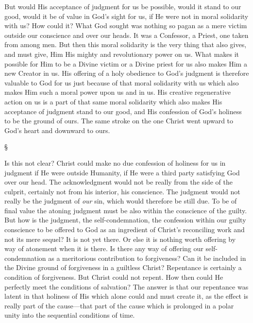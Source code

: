 \documentclass[12pt,letterpaper,oneside]{book}
\begin{document}
But would His acceptance of judgment for us 
be possible, would it stand to our good, would 
it be of value in God's sight for us, if He 
were not in moral solidarity with us? How 
could it? What God sought was nothing so 
pagan as a mere victim outside our conscience 
and over our heads. It was a Confessor, a 
Priest, one taken from among men. But then 
this moral solidarity is the very thing that 
also gives, and must give, Him His mighty and 
revolutionary power on us. What makes it 
possible for Him to be a Divine victim or a 
Divine priest for us also makes Him a new 
Creator in us. His offering of a holy obedience 
to God's judgment is therefore valuable to God 
for us just because of that moral solidarity 
with us which also makes Him such a moral 
power upon us and in us. His creative regenerative 
action on us is a part of that same 
moral solidarity which also makes His acceptance
of judgment stand to our good, and His 
confession of God's holiness to be the ground 
of ours. The same stroke on the one Christ 
went upward to God's heart and downward 
to ours. 

\begin{center}
\S
\end{center}

Is this not clear? Christ could make no due 
confession of holiness for us in judgment if 
He were outside Humanity, if He were a third 
party satisfying God over our head. The acknowledgment 
would not be really from the 
side of the culprit, certainly not from his interior, 
his conscience. The judgment would not 
really be the judgment of \textit{our} sin, which would 
therefore be still due. To be of final value 
the atoning judgment must be also within the 
conscience of the guilty. But how is the judgment, 
the self-condemnation, the confession within 
our guilty conscience to be offered to God 
as an ingredient of Christ's reconciling work 
and not its mere sequel? It is not yet there. 
Or else it is nothing worth offering by way of 
atonement when it is there. Is there any way of 
offering our self-condemnation as a meritorious 
contribution to forgiveness? Can it be included 
in the Divine ground of forgiveness in a guiltless 
Christ? Repentance is certainly a condition 
of forgiveness. But Christ could not repent. 
How then could He perfectly meet the conditions 
of salvation? The answer is that our 
repentance was latent in that holiness of His 
which alone could and must create it, as the 
effect is really part of the cause---that part of 
the cause which is prolonged in a polar unity 
into the sequential conditions of time. 
\end{document}

